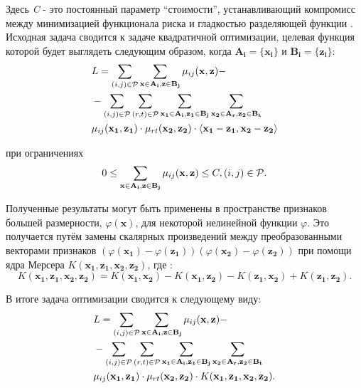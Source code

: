 \documentclass[10pt,a5paper,oneside]{article}
\begin{document}
\par
Здесь \emph{C} - это постоянный параметр ``стоимости'', устанавливающий компромисс между минимизацией функционала риска и гладкостью разделяющей функции . 
Исходная задача сводится к задаче квадратичной оптимизации, целевая функция которой будет выглядеть следующим образом, когда \(\mathbf{A_i} = \{\mathbf{x_i}\}\) и \(\mathbf{B_i} = \{\mathbf{z_i}\}\): 
\mbox{}
\begin{eqnarray*}
&L = \sum \limits_{(i, j) \in \mathcal{P}} \sum \limits_{\mathbf{x} \in \mathbf{A_i}, \mathbf{z} \in \mathbf{B_j}} \mu_{ij} (\mathbf{x}, \mathbf{z}) - \\
&- \sum \limits_{(i, j) \in \mathcal{P}} \sum \limits_{(r, t) \in \mathcal{P}} \sum \limits_{\mathbf{x_1} \in \mathbf{A_i}, \mathbf{z_1} \in \mathbf{B_j}} \sum \limits_{\mathbf{x_2} \in \mathbf{A_r}, \mathbf{z_2} \in \mathbf{B_t}} \\
&\mu_{ij} (\mathbf{x_1}, \mathbf{z_1}) \cdot \mu_{rt} (\mathbf{x_2}, \mathbf{z_2}) \cdot \langle \mathbf{x_1} - \mathbf{z_1}, \mathbf{x_2} - \mathbf{z_2} \rangle
\end{eqnarray*}

\par
при ограничениях
\mbox{}
\[
0 \leq \sum \limits_{\mathbf{x} \in \mathbf{A_i}, \mathbf{z} \in \mathbf{B_j}} \mu_{ij} (\mathbf{x}, \mathbf{z}) \leq C, (i, j) \in \mathcal{P}.
\]

\par
Полученные результаты могут быть применены в пространстве признаков большей размерности, \(\varphi(\mathbf{x})\), для некоторой нелинейной функции \(\varphi\). 
Это получается путём замены скалярных произведений между преобразованными векторами признаков \((\varphi(\mathbf{x_1}) - \varphi(\mathbf{z_1})) (\varphi(\mathbf{x_2}) - \varphi(\mathbf{z_2}))\) при помощи ядра Мерсера \(K(\mathbf{x_1}, \mathbf{z_1}, \mathbf{x_2}, \mathbf{z_2})\), где :
\mbox{}
\[
K(\mathbf{x_1}, \mathbf{z_1}, \mathbf{x_2}, \mathbf{z_2}) = K(\mathbf{x_1}, \mathbf{x_2}) - K(\mathbf{x_1}, \mathbf{z_2}) - K(\mathbf{z_1}, \mathbf{x_2}) + K(\mathbf{z_1}, \mathbf{z_2}).
\]

\par
В итоге задача оптимизации сводится к следующему виду:
\mbox{}
\begin{eqnarray*}
&L = \sum \limits_{(i, j) \in \mathcal{P}} \sum \limits_{\mathbf{x} \in \mathbf{A_i}, \mathbf{z} \in \mathbf{B_j}} \mu_{ij} (\mathbf{x}, \mathbf{z}) - \\
&- \sum \limits_{(i, j) \in \mathcal{P}} \sum \limits_{(r, t) \in \mathcal{P}} \sum \limits_{\mathbf{x_1} \in \mathbf{A_i}, \mathbf{z_1} \in \mathbf{B_j}} \sum \limits_{\mathbf{x_2} \in \mathbf{A_r}, \mathbf{z_2} \in \mathbf{B_t}} \\
&\mu_{ij} (\mathbf{x_1}, \mathbf{z_1}) \cdot \mu_{rt} (\mathbf{x_2}, \mathbf{z_2}) \cdot K(\mathbf{x_1}, \mathbf{z_1}, \mathbf{x_2}, \mathbf{z_2}).
\end{eqnarray*}
\end{document}
